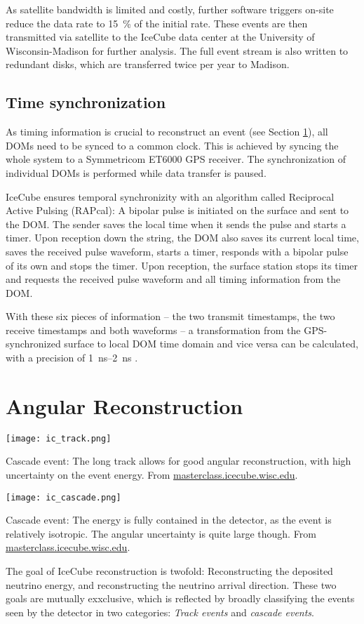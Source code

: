 As satellite bandwidth is limited and costly, further software triggers on-site reduce the data rate to \SI{15}{\percent} of the initial rate. These events are then transmitted via satellite to the IceCube data center at the University of Wisconsin-Madison for further analysis. The full event stream is also written to redundant disks, which are transferred twice per year to Madison.

\subsection{Time synchronization}
As timing information is crucial to reconstruct an event (see Section \ref{reconstruction}), all DOMs need to be synced to a common clock. This is achieved by syncing the whole system to a Symmetricom ET6000 GPS receiver. The synchronization of individual DOMs is performed while data transfer is paused.

IceCube ensures temporal synchronizity with an algorithm called Reciprocal Active Pulsing (RAPcal): A bipolar pulse is initiated on the surface and sent to the DOM. The sender saves the local time when it sends the pulse and starts a timer. Upon reception down the string, the DOM also saves its current local time, saves the received pulse waveform, starts a timer, responds with a bipolar pulse of its own and stops the timer. Upon reception, the surface station stops its timer and requests the received pulse waveform and all timing information from the DOM.

With these six pieces of information -- the two transmit timestamps, the two receive timestamps and both waveforms -- a transformation from the GPS-synchronized surface to local DOM time domain and vice versa can be calculated, with a precision of \SIrange{1}{2}{\ns} .

\section{Angular Reconstruction}\label{reconstruction}
\begin{marginfigure}
    \texttt{[image: ic\_track.png]}
    \caption[Track event in IceCube]{Cascade event: The long track allows for good angular reconstruction, with high uncertainty on the event energy. From \url{masterclass.icecube.wisc.edu}.}
\end{marginfigure}
\begin{marginfigure}
    \texttt{[image: ic\_cascade.png]}
    \caption[Cascade event in IceCube]{Cascade event: The energy is fully contained in the detector, as the event is relatively isotropic. The angular uncertainty is quite large though. From \url{masterclass.icecube.wisc.edu}.}
\end{marginfigure}
The goal of IceCube reconstruction is twofold: Reconstructing the deposited neutrino energy, and reconstructing the neutrino arrival direction. These two goals are mutually exxclusive, which is reflected by broadly classifying the events seen by the detector in two categories: \textit{Track events} and \textit{cascade events}.

